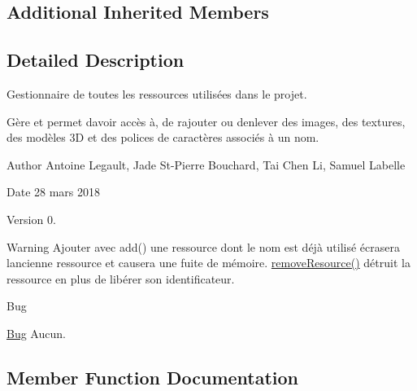\subsection*{Additional Inherited Members}


\subsection{Detailed Description}
Gestionnaire de toutes les ressources utilisées dans le projet. 

Gère et permet d\textquotesingle{}avoir accès à, de rajouter ou d\textquotesingle{}enlever des images, des textures, des modèles 3\+D et des polices de caractères associés à un nom. \begin{DoxyAuthor}{Author}
Antoine Legault, Jade St-\/\+Pierre Bouchard, Tai Chen Li, Samuel Labelle 
\end{DoxyAuthor}
\begin{DoxyDate}{Date}
28 mars 2018 
\end{DoxyDate}
\begin{DoxyVersion}{Version}
0. 
\end{DoxyVersion}
\begin{DoxyWarning}{Warning}
Ajouter avec add() une ressource dont le nom est déjà utilisé écrasera l\textquotesingle{}ancienne ressource et causera une fuite de mémoire. \hyperlink{class_resource_manager_ab643fdd28a7929892b5d5d1ae2686601}{remove\+Resource()} détruit la ressource en plus de libérer son identificateur. 
\end{DoxyWarning}
\begin{DoxyRefDesc}{Bug}
\item[\hyperlink{bug__bug000016}{Bug}]Aucun. \end{DoxyRefDesc}


\subsection{Member Function Documentation}
\hypertarget{class_resource_manager_a850b34fa48b9e5fbb26f64b0b03cc657}{}
